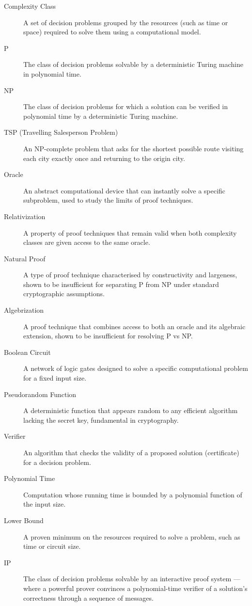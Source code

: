 \documentclass[12pt]{report}
\begin{document}
\begin{description}
    \item[Complexity Class] A set of decision problems grouped by the resources (such as time or space) required to solve them using a computational model.
    \item[P] The class of decision problems solvable by a deterministic Turing machine in polynomial time.
    \item[NP] The class of decision problems for which a solution can be verified in polynomial time by a deterministic Turing machine.
    \item[TSP (Travelling Salesperson Problem)] An NP-complete problem that asks for the shortest possible route visiting each city exactly once and returning to the origin city.
    \item[Oracle] An abstract computational device that can instantly solve a specific subproblem, used to study the limits of proof techniques.
    \item[Relativization] A property of proof techniques that remain valid when both complexity classes are given access to the same oracle.
    \item[Natural Proof] A type of proof technique characterised by constructivity and largeness, shown to be insufficient for separating P from NP under standard cryptographic assumptions.
    \item[Algebrization] A proof technique that combines access to both an oracle and its algebraic extension, shown to be insufficient for resolving P vs NP.
    \item[Boolean Circuit] A network of logic gates designed to solve a specific computational problem for a fixed input size.
    \item[Pseudorandom Function] A deterministic function that appears random to any efficient algorithm lacking the secret key, fundamental in cryptography.
    \item[Verifier] An algorithm that checks the validity of a proposed solution (certificate) for a decision problem.
    \item[Polynomial Time] Computation whose running time is bounded by a polynomial function of the input size.
    \item[Lower Bound] A proven minimum on the resources required to solve a problem, such as time or circuit size.
    \item[IP] The class of decision problems solvable by an interactive proof system --- where a powerful prover convinces a polynomial-time verifier of a solution's correctness through a sequence of messages.

\end{description}
\end{document}
